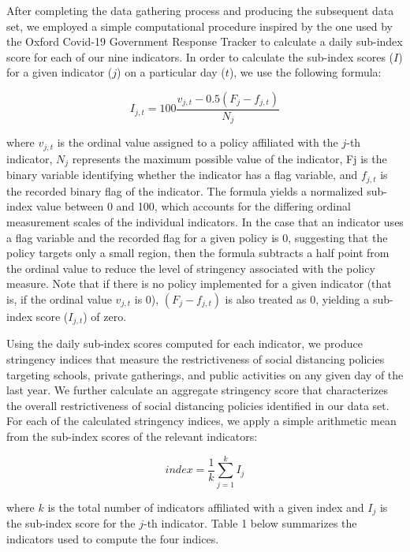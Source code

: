 After completing the data gathering process and producing the subsequent data set, we employed a simple computational procedure inspired by the one used by the Oxford Covid-19 Government Response Tracker to calculate a daily sub-index score for each of our nine indicators. In order to calculate the sub-index scores ($I$) for a given indicator ($j$) on a particular day ($t$), we use the following formula:

\begin{equation}\label{eq:Eq1}
  I_{j,t} = 100\frac{v_{j,t} - 0.5\left(F_j - f_{j,t}\right)}{N_j}
\end{equation}

where $v_{j,t}$ is the ordinal value assigned to a policy affiliated with the $j$-th indicator, $N_j$ represents the maximum possible value of the indicator, Fj is the binary variable identifying whether the indicator has a flag variable, and $f_{j,t}$ is the recorded binary flag of the indicator. The formula yields a normalized sub-index value between 0 and 100, which accounts for the differing ordinal measurement scales of the individual indicators. In the case that an indicator uses a flag variable and the recorded flag for a given policy is 0, suggesting that the policy targets only a small region, then the formula subtracts a half point from the ordinal value to reduce the level of stringency associated with the policy measure. Note that if there is no policy implemented for a given indicator (that is, if the ordinal value $v_{j,t}$ is 0),   $\left(F_{j} - f_{j,t}\right)$ is also treated as 0, yielding a sub-index score ($I_{j,t}$) of zero.

Using the daily sub-index scores computed for each indicator, we produce stringency indices that measure the restrictiveness of social distancing policies targeting schools, private gatherings, and public activities on any given day of the last year. We further calculate an aggregate stringency score that characterizes the overall restrictiveness of social distancing policies identified in our data set. For each of the calculated stringency indices, we apply a simple arithmetic mean from the sub-index scores of the relevant indicators:

\begin{equation}\label{eq:Eq2}
  \text{$index$} = \frac{1}{k} \sum_{j=1}^{k}I_j
\end{equation}

where $k$ is the total number of indicators affiliated with a given index and $I_{j}$ is the sub-index score for the $j$-th indicator. Table 1 below summarizes the indicators used to compute the four indices.

